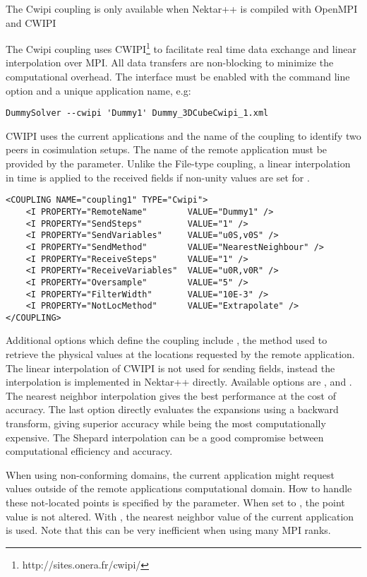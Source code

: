 \begin{notebox}
    The Cwipi coupling is only available when Nektar++ is compiled with OpenMPI and CWIPI
\end{notebox}
The Cwipi coupling uses CWIPI\footnote{http://sites.onera.fr/cwipi/} to facilitate real time data exchange and linear interpolation over MPI.
All data transfers are non-blocking to minimize the computational overhead.
The interface must be enabled with the command line option  and a unique application name, e.g:\begin{lstlisting}[style=BashInputStyle] 
DummySolver --cwipi 'Dummy1' Dummy_3DCubeCwipi_1.xml
\end{lstlisting}
CWIPI uses the current applications and the name of the coupling to identify two peers in cosimulation setups.
The name of the remote application must be provided by the  parameter.
Unlike the File-type coupling, a linear interpolation in time is applied to the received fields if non-unity values are set for .
\begin{lstlisting}[style=XMLStyle] 
<COUPLING NAME="coupling1" TYPE="Cwipi">
    <I PROPERTY="RemoteName"        VALUE="Dummy1" />
    <I PROPERTY="SendSteps"         VALUE="1" />
    <I PROPERTY="SendVariables"     VALUE="u0S,v0S" />
    <I PROPERTY="SendMethod"        VALUE="NearestNeighbour" />
    <I PROPERTY="ReceiveSteps"      VALUE="1" />
    <I PROPERTY="ReceiveVariables"  VALUE="u0R,v0R" />
    <I PROPERTY="Oversample"        VALUE="5" />
    <I PROPERTY="FilterWidth"       VALUE="10E-3" />
    <I PROPERTY="NotLocMethod"      VALUE="Extrapolate" />
</COUPLING>
\end{lstlisting}

Additional options which define the coupling include , the method used to retrieve the physical values at the locations requested by the remote application.
The linear interpolation of CWIPI is not used for sending fields, instead the interpolation is implemented in Nektar++ directly.
Available options are ,  and . 
The nearest neighbor interpolation gives the best performance at the cost of accuracy. 
The last option directly evaluates the expansions using a backward transform, giving superior accuracy while being the most computationally expensive. 
The Shepard interpolation can be a good compromise between computational efficiency and accuracy.

When using non-conforming domains, the current application might request values outside of the remote applications computational domain.
How to handle these not-located points is specified by the  parameter.
When set to , the point value is not altered.
With , the nearest neighbor value of the current application is used.
Note that this can be very inefficient when using many MPI ranks.


